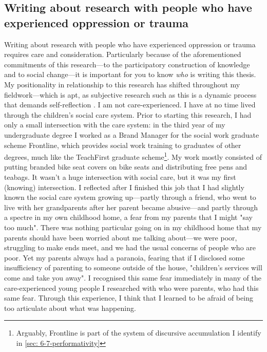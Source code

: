 \subsection{Writing about research with people who have experienced oppression or trauma}
Writing about research with people who have experienced oppression or trauma requires care and consideration. Particularly because of the aforementioned commitments of this research—to the participatory construction of knowledge and to social change—it is important for you to know \emph{who} is writing this thesis. My positionality in relationship to this research has shifted throughout my fieldwork—which is apt, as subjective research such as this is a dynamic process that demands self-reflection \citep{rose_situating_1997}. I am not care-experienced. I have at no time lived through the children’s social care system. Prior to starting this research, I had only a small intersection with the care system: in the third year of my undergraduate degree I worked as a Brand Manager for the social work graduate scheme Frontline, which provides social work training to graduates of other degrees, much like the TeachFirst graduate scheme\footnote{Arguably, Frontline is part of the system of discursive accumulation I identify in \ref{sec: 6-7-performativity}}. My work mostly consisted of putting branded bike seat covers on bike seats and distributing free pens and teabags. It wasn’t a huge intersection with social care, but it was my first (knowing) intersection. I reflected after I finished this job that I had slightly known the social care system growing up—partly through a friend, who went to live with her grandparents after her parent became abusive—and partly through a spectre in my own childhood home, a fear from my parents that I might "say too much". There was nothing particular going on in my childhood home that my parents should have been worried about me talking about—we were poor, struggling to make ends meet, and we had the usual concerns of people who are poor. Yet my parents always had a paranoia, fearing that if I disclosed some insufficiency of parenting to someone outside of the house, "children’s services will come and take you away". I recognised this same fear immediately in many of the care-experienced young people I researched with who were parents, who had this same fear. Through this experience, I think that I learned to be afraid of being too articulate about what was happening.

